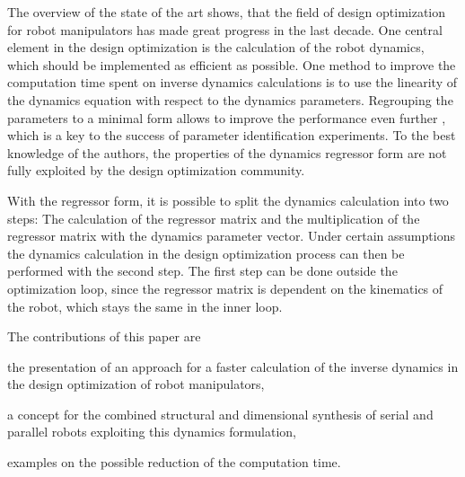 \documentclass{svproc}
\begin{document}
The overview of the state of the art shows, that the field of design optimization for robot manipulators has made great progress in the last decade.
One central element in the design optimization is the calculation of the robot dynamics, which should be implemented as efficient as possible.
One method to improve the computation time spent on inverse dynamics calculations is to use the linearity of the dynamics equation with respect to the dynamics parameters.
Regrouping the parameters to a minimal form allows to improve the performance even further \cite{KhalilDom2002}, which is a key to the success of parameter identification experiments.
To the best knowledge of the authors, the properties of the dynamics regressor form are not fully exploited by the design optimization community.

With the regressor form, it is possible to split the dynamics calculation into two steps: The calculation of the regressor matrix and the  multiplication of the regressor matrix with the dynamics parameter vector.
Under certain assumptions the dynamics calculation in the design optimization process can then be performed with the second step.
The first step can be done outside the optimization loop, since the regressor matrix is dependent on the kinematics of the robot, which stays the same in the inner loop.

The contributions of this paper are
\begin{compactitem}
    \item the presentation of an approach for a faster calculation of the inverse dynamics in the design optimization of robot manipulators,
    \item a concept for the combined structural and dimensional synthesis of serial and parallel robots exploiting this dynamics formulation,
    \item examples on the possible reduction of the computation time.
\end{compactitem}
\end{document}
